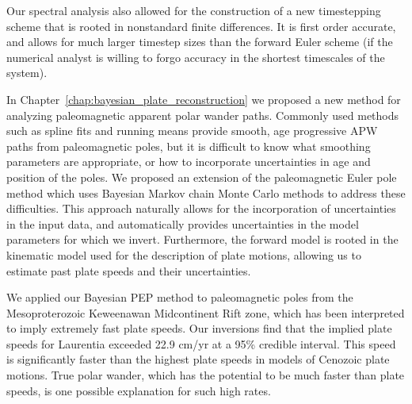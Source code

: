 Our spectral analysis also allowed for the construction of a new timestepping
scheme that is rooted in nonstandard finite differences. It is first order accurate,
and allows for much larger timestep sizes than the forward Euler scheme 
(if the numerical analyst is willing to forgo accuracy in the shortest timescales of the system).

In Chapter~\ref{chap:bayesian_plate_reconstruction} we proposed a new method
for analyzing paleomagnetic apparent polar wander paths. Commonly used methods
such as spline fits and running means provide smooth, age progressive APW paths
from paleomagnetic poles, but it is difficult to know what smoothing parameters
are appropriate, or how to incorporate uncertainties in age and position of the poles.
We proposed an extension of the paleomagnetic Euler pole method which uses Bayesian
Markov chain Monte Carlo methods to address these difficulties.
This approach naturally allows for the incorporation of uncertainties in the input data,
and automatically provides uncertainties in the model parameters for which we invert.
Furthermore, the forward model is rooted in the kinematic model used
for the description of plate motions, allowing us to estimate past plate speeds
and their uncertainties.

We applied our Bayesian PEP method to paleomagnetic poles from the 
Mesoproterozoic Keweenawan Midcontinent Rift zone, which has been interpreted to
imply extremely fast plate speeds. Our inversions find that the implied plate
speeds for Laurentia exceeded 22.9 cm/yr at a 95\% credible interval.
This speed is significantly faster than the highest plate speeds in
models of Cenozoic plate motions. True polar wander, which has the potential
to be much faster than plate speeds, is one possible explanation for such high rates.
